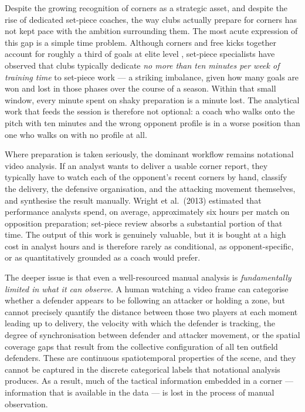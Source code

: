 Despite the growing recognition of corners as a strategic asset, and despite
the rise of dedicated set-piece coaches, the way clubs actually prepare for
corners has not kept pace with the ambition surrounding them. The most acute
expression of this gap is a simple time problem. Although corners and free
kicks together account for roughly a third of goals at elite level
\citep{ShawGopaladesikan2020}, set-piece specialists have observed that
clubs typically dedicate \emph{no more than ten minutes per week of training
time} to set-piece work --- a striking imbalance, given how many goals are
won and lost in those phases over the course of a season. Within that small
window, every minute spent on shaky preparation is a minute lost. The
analytical work that feeds the session is therefore not optional: a coach
who walks onto the pitch with ten minutes and the wrong opponent profile is
in a worse position than one who walks on with no profile at all.

Where preparation is taken seriously, the dominant workflow remains notational
video analysis. If an analyst wants to deliver a usable corner report, they
typically have to watch each of the opponent's recent corners by hand, classify
the delivery, the defensive organisation, and the attacking movement
themselves, and synthesise the result manually. Wright et al.\ (2013) estimated
that performance analysts spend, on average, approximately six hours per match
on opposition preparation; set-piece review absorbs a substantial portion of
that time. The output of this work is genuinely valuable, but it is bought at
a high cost in analyst hours and is therefore rarely as conditional, as
opponent-specific, or as quantitatively grounded as a coach would prefer.

The deeper issue is that even a well-resourced manual analysis is
\emph{fundamentally limited in what it can observe}. A human watching a video
frame can categorise whether a defender appears to be following an attacker
or holding a zone, but cannot precisely quantify the distance between those
two players at each moment leading up to delivery, the velocity with which
the defender is tracking, the degree of synchronisation between defender and
attacker movement, or the spatial coverage gaps that result from the
collective configuration of all ten outfield defenders. These are continuous
spatiotemporal properties of the scene, and they cannot be captured in the
discrete categorical labels that notational analysis produces. As a result,
much of the tactical information embedded in a corner --- information that is
available in the data --- is lost in the process of manual observation.

